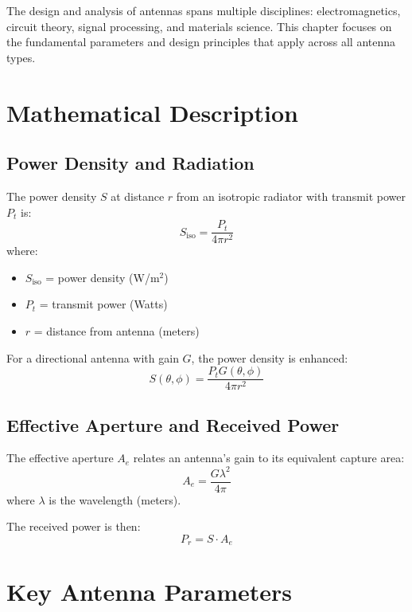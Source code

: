 The design and analysis of antennas spans multiple disciplines: electromagnetics, circuit theory, signal processing, and materials science. This chapter focuses on the fundamental parameters and design principles that apply across all antenna types.

\section{Mathematical Description}

\subsection{Power Density and Radiation}

The power density $S$ at distance $r$ from an isotropic radiator with transmit power $P_t$ is:
\begin{equation}
S_{\text{iso}} = \frac{P_t}{4\pi r^2}
\label{eq:power-density-iso}
\end{equation}
where:
\begin{itemize}
\item $S_{\text{iso}}$ = power density (W/m$^2$)
\item $P_t$ = transmit power (Watts)
\item $r$ = distance from antenna (meters)
\end{itemize}

For a directional antenna with gain $G$, the power density is enhanced:
\begin{equation}
S(\theta, \phi) = \frac{P_t G(\theta, \phi)}{4\pi r^2}
\label{eq:power-density-directional}
\end{equation}

\subsection{Effective Aperture and Received Power}

The effective aperture $A_e$ relates an antenna's gain to its equivalent capture area:
\begin{equation}
A_e = \frac{G \lambda^2}{4\pi}
\label{eq:effective-aperture}
\end{equation}
where $\lambda$ is the wavelength (meters).

The received power is then:
\begin{equation}
P_r = S \cdot A_e
\label{eq:received-power}
\end{equation}

\section{Key Antenna Parameters}

